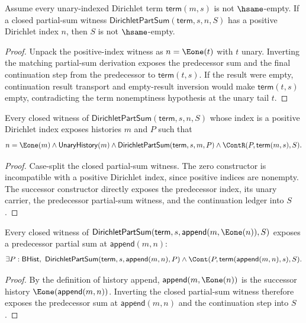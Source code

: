 \begin{theorem}
\label{thm:dirichlet-part-sum-positive-index-result-nonempty}
Assume every unary-indexed Dirichlet term $\mathsf{term}(m,s)$ is not
\(\hsame\)-empty. If a closed partial-sum witness
\(\mathsf{DirichletPartSum}(\mathsf{term},s,n,S)\) has a positive Dirichlet
index \(n\), then \(S\) is not \(\hsame\)-empty.
\end{theorem}
\begin{proof}
Unpack the positive-index witness as \(n=\Eone(t)\) with \(t\) unary. Inverting
the matching partial-sum derivation exposes the predecessor sum and the final
continuation step from the predecessor to \(\mathsf{term}(t,s)\). If the result
were empty, continuation result transport and empty-result inversion would make
\(\mathsf{term}(t,s)\) empty, contradicting the term nonemptiness hypothesis at
the unary tail \(t\).
\end{proof}

\begin{theorem}
\label{thm:dirichlet-part-sum-positive-index-predecessor}
Every closed witness of \(\mathsf{DirichletPartSum}(\mathsf{term},s,n,S)\)
whose index is a positive Dirichlet index exposes histories \(m\) and \(P\)
such that
$$
n=\Eone(m)\land
\mathsf{UnaryHistory}(m)\land
\mathsf{DirichletPartSum}(\mathsf{term},s,m,P)\land
\ContR(P,\mathsf{term}(m,s),S).
$$
\end{theorem}
\begin{proof}
Case-split the closed partial-sum witness. The zero constructor is
incompatible with a positive Dirichlet index, since positive indices are
nonempty. The successor constructor directly exposes the predecessor index,
its unary carrier, the predecessor partial-sum witness, and the continuation
ledger into \(S\).
\end{proof}

\begin{theorem}
\label{thm:dirichlet-part-sum-append-successor-predecessor}
Every closed witness of
$\mathsf{DirichletPartSum}(\mathsf{term},s,\mathsf{append}(m,\Eone(n)),S)$
exposes a predecessor partial sum at $\mathsf{append}(m,n)$:
$$
\exists P:\mathsf{BHist},\
\mathsf{DirichletPartSum}(\mathsf{term},s,\mathsf{append}(m,n),P)\land
\Cont(P,\mathsf{term}(\mathsf{append}(m,n),s),S).
$$
\end{theorem}
\begin{proof}
By the definition of history append, $\mathsf{append}(m,\Eone(n))$ is the
successor history $\Eone(\mathsf{append}(m,n))$. Inverting the closed
partial-sum witness therefore exposes the predecessor sum at
$\mathsf{append}(m,n)$ and the continuation step into $S$.
\end{proof}

